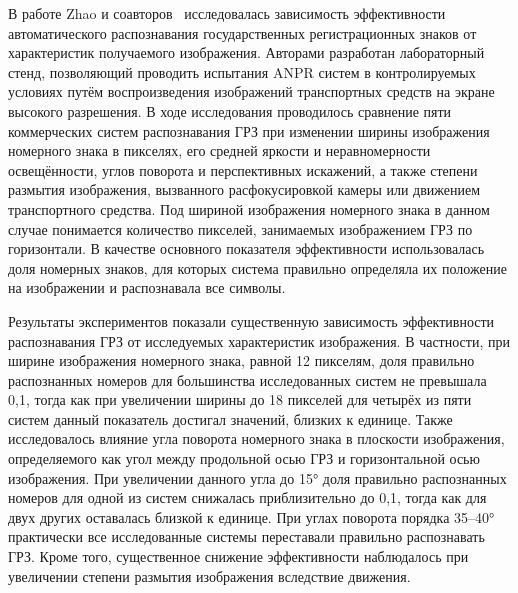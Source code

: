\documentclass[12pt]{article}
\theoremstyle{definition}
\begin{document}
В работе Zhao и соавторов~\cite{Zhao2025} исследовалась зависимость эффективности автоматического распознавания государственных регистрационных знаков от характеристик получаемого изображения. Авторами разработан лабораторный стенд, позволяющий проводить испытания ANPR систем в контролируемых условиях путём воспроизведения изображений транспортных средств на экране высокого разрешения. В ходе исследования проводилось сравнение пяти коммерческих систем распознавания ГРЗ при изменении ширины изображения номерного знака в пикселях, его средней яркости и неравномерности освещённости, углов поворота и перспективных искажений, а также степени размытия изображения, вызванного расфокусировкой камеры или движением транспортного средства. Под шириной изображения номерного знака в данном случае понимается количество пикселей, занимаемых изображением ГРЗ по горизонтали. В качестве основного показателя эффективности использовалась доля номерных знаков, для которых система правильно определяла их положение на изображении и распознавала все символы.

Результаты экспериментов показали существенную зависимость эффективности распознавания ГРЗ от исследуемых характеристик изображения. В частности, при ширине изображения номерного знака, равной 12 пикселям, доля правильно распознанных номеров для большинства исследованных систем не превышала 0,1, тогда как при увеличении ширины до 18 пикселей для четырёх из пяти систем данный показатель достигал значений, близких к единице. Также исследовалось влияние угла поворота номерного знака в плоскости изображения, определяемого как угол между продольной осью ГРЗ и горизонтальной осью изображения. При увеличении данного угла до 15° доля правильно распознанных номеров для одной из систем снижалась приблизительно до 0,1, тогда как для двух других оставалась близкой к единице. При углах поворота порядка 35–40° практически все исследованные системы переставали правильно распознавать ГРЗ. Кроме того, существенное снижение эффективности наблюдалось при увеличении степени размытия изображения вследствие движения.
\end{document}
